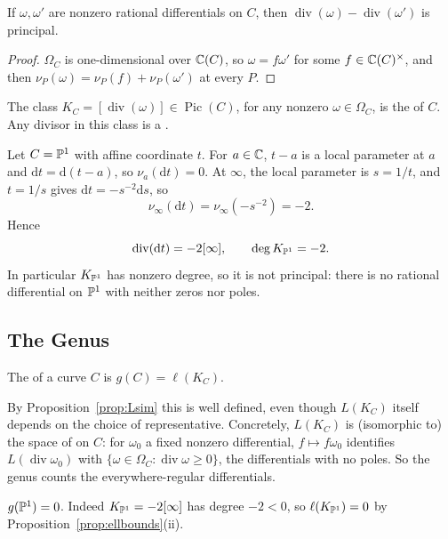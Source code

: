 \documentclass[a4paper]{scrartcl}
\newcommand{\dee}{\mathrm{d}}
\DeclareMathOperator{\Divv}{div}
\DeclareMathOperator{\Pic}{Pic}
\begin{document}
\begin{proposition}
	If $\omega,\omega'$ are nonzero rational differentials on $C$, then $\Divv(\omega) - \Divv(\omega')$ is principal.
\end{proposition}

\begin{proof}
	$\Omega_C$ is one-dimensional over $\mathbb{C}(C)$, so $\omega = f\omega'$ for some $f \in \mathbb{C}(C)^\times$, and then $\nu_P(\omega) = \nu_P(f) + \nu_P(\omega')$ at every $P$.
\end{proof}

\begin{definition}
	The class $K_C = [\Divv(\omega)] \in \Pic(C)$, for any nonzero $\omega \in \Omega_C$, is the  of $C$. Any divisor in this class is a .
\end{definition}

\begin{example}\label{ex:divdt}
	Let $C = \mathbb{P}^1$ with affine coordinate $t$. For $a \in \mathbb{C}$, $t - a$ is a local parameter at $a$ and $\dee t = \dee(t-a)$, so $\nu_a(\dee t) = 0$. At $\infty$, the local parameter is $s = 1/t$, and $t = 1/s$ gives $\dee t = -s^{-2}\dee s$, so
	$$\nu_\infty(\dee t) = \nu_\infty(-s^{-2}) = -2.$$
	Hence
	$$\Divv(\dee t) = -2[\infty], \qquad \deg K_{\PP^1} = -2.$$
	In particular $K_{\mathbb{P}^1}$ has nonzero degree, so it is not principal: there is no rational differential on $\mathbb{P}^1$ with neither zeros nor poles.
\end{example}

\subsection{The Genus}

\begin{definition}[Genus]
	The  of a curve $C$ is $g(C) = \ell(K_C)$.
\end{definition}

By Proposition~\ref{prop:Lsim} this is well defined, even though $L(K_C)$ itself depends on the choice of representative. Concretely, $L(K_C)$ is (isomorphic to) the space of  on $C$: for $\omega_0$ a fixed nonzero differential, $f \mapsto f\omega_0$ identifies $L(\Divv\omega_0)$ with $\{\omega \in \Omega_C : \Divv\omega \geq 0\}$, the differentials with no poles. So the genus counts the everywhere-regular differentials.

\begin{example}
	$g(\mathbb{P}^1) = 0$. Indeed $K_{\mathbb{P}^1} = -2[\infty]$ has degree $-2 < 0$, so $\ell(K_{\mathbb{P}^1}) = 0$ by Proposition~\ref{prop:ellbounds}(ii).
\end{example}
\end{document}
